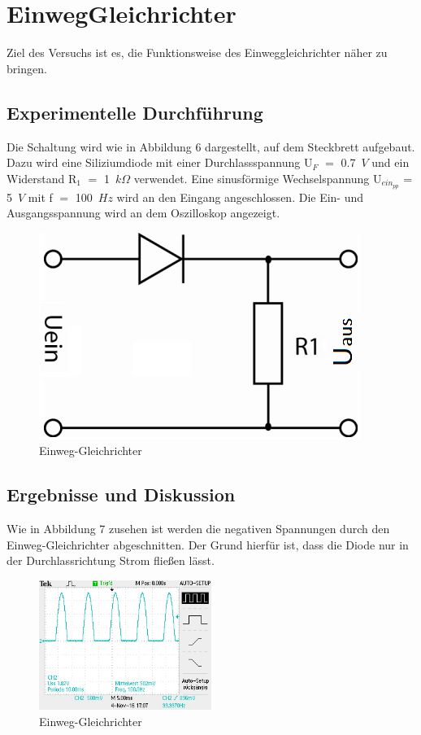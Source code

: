\section{EinwegGleichrichter}
Ziel des Versuchs ist es, die Funktionsweise des Einweggleichrichter n\"aher zu bringen. 
\subsection{Experimentelle Durchf\"uhrung}
Die Schaltung wird wie in Abbildung 6 dargestellt, auf dem Steckbrett aufgebaut. Dazu wird eine Siliziumdiode mit einer Durchlassspannung U$_F$ $=$ 0.7~$V$ und ein Widerstand R$_1$ $=$ 1~$k\Omega$ verwendet. Eine sinusf\"ormige Wechselspannung U$_{ein_{pp}}$ = 5~$V$ mit f $=$ 100~$Hz$ wird an den Eingang angeschlossen. Die Ein- und Ausgangsspannung wird an dem Oszilloskop angezeigt.
\begin{figure}[ht]
\begin{center}
\includegraphics[scale=0.5]{schaltungVersuch2}
\caption{Einweg-Gleichrichter}
\end{center}
\end{figure}
\subsection{Ergebnisse und Diskussion}

Wie in Abbildung 7 zusehen ist werden die negativen Spannungen durch den Einweg-Gleichrichter abgeschnitten. Der Grund hierf\"ur ist, dass die Diode nur in der Durchlassrichtung Strom flie\ss en l\"asst. 
\begin{figure}[ht]
\begin{center}
\includegraphics[width=0.5\textwidth]{Bilder/TEK0006}
\caption{Einweg-Gleichrichter}
\end{center}
\end{figure}